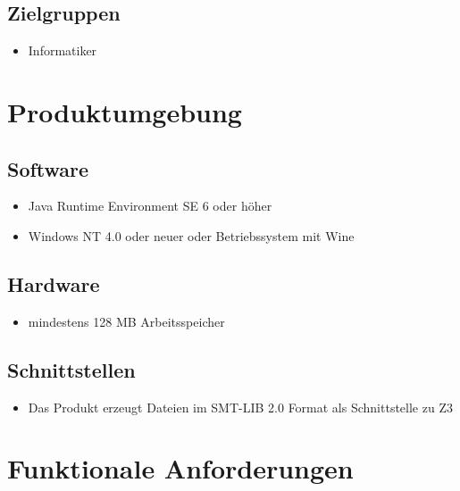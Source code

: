 \documentclass[a4paper,10pt]{article}
\begin{document}
\subsection{Zielgruppen}
\begin{itemize}
  \item Informatiker
\end{itemize}

\section{Produktumgebung}
\subsection{Software}
\begin{itemize}
  \item Java Runtime Environment SE 6 oder höher
  \item Windows NT 4.0 oder neuer oder Betriebssystem mit Wine
\end{itemize}

\subsection{Hardware}
\begin{itemize}
  \item mindestens 128 MB Arbeitsspeicher
\end{itemize}

\subsection{Schnittstellen}
\begin{itemize}
  \item Das Produkt erzeugt Dateien im SMT-LIB 2.0 Format als Schnittstelle zu Z3
\end{itemize}

\section{Funktionale Anforderungen}
\end{document}
